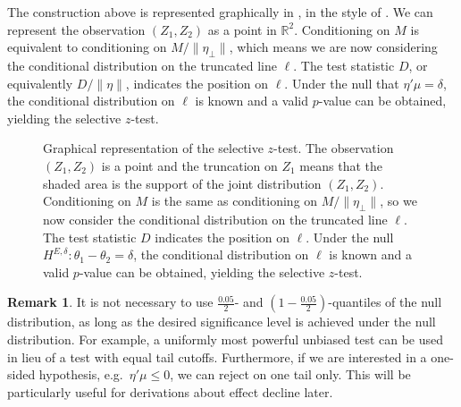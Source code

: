 \documentclass[11pt]{article}
\theoremstyle{definition}
\newtheorem*{remark}{Remark}
\theoremstyle{custom}
\begin{document}
  The construction above is represented graphically in , in the style of \citet{Lee:2016fv}. We can represent the observation $(Z_1, Z_2)$ as a point in $\mathbb{R}^2$. Conditioning on $M$ is equivalent to conditioning on $M / \|\eta_\perp\|$, which means we are now considering the conditional distribution on the truncated line $\ell$. The test statistic $D$, or equivalently $D / \|\eta\|$, indicates the position on $\ell$. Under the null that $\eta' \mu  = \delta$, the conditional distribution on $\ell$ is known and a valid $p$-value can be obtained, yielding the selective $z$-test.
  \begin{figure}[htbp]
    \centering
    \caption{Graphical representation of the selective $z$-test. The observation $(Z_1, Z_2)$ is a point and the truncation on $Z_1$ means that the shaded area is the support of the joint distribution $(Z_1, Z_2)$. Conditioning on $M$ is the same as conditioning on $M / \|\eta_\perp\|$, so we now consider the conditional distribution on the truncated line $\ell$. The test statistic $D$ indicates the position on $\ell$. Under the null $H^{E,\delta}: \theta_1 - \theta_2 = \delta$, the conditional distribution on $\ell$ is known and a valid $p$-value can be obtained, yielding the selective $z$-test.}
  \label{fig:sel-gauss}
  \end{figure}

  \begin{remark}
    It is not necessary to use $\frac{0.05}{2}$- and $(1 - \frac{0.05}{2})$-quantiles of the null distribution, as long as the desired significance level is achieved under the null distribution. For example, a uniformly most powerful unbiased test can be used in lieu of a test with equal tail cutoffs. Furthermore, if we are interested in a one-sided hypothesis, e.g.\ $\eta' \mu \le 0$, we can reject on one tail only. This will be particularly useful for derivations about effect decline later.
  \end{remark}
\end{document}
